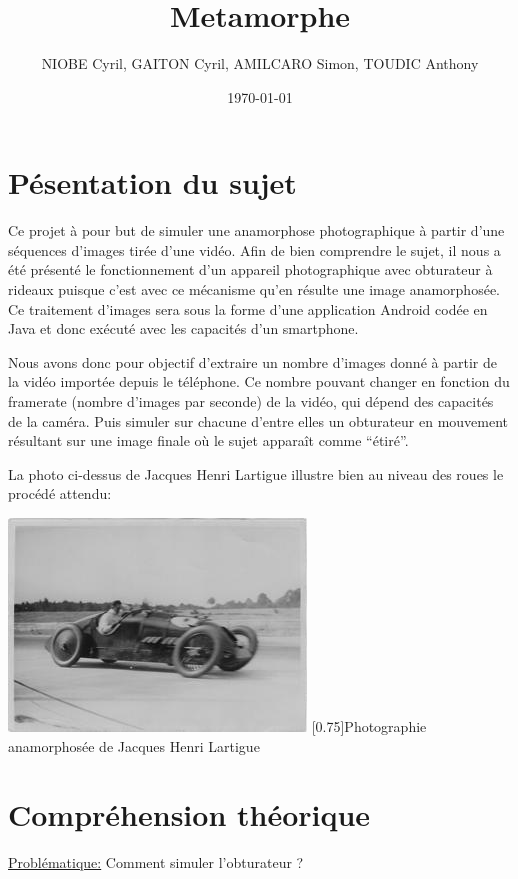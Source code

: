 \documentclass[a4paper,12pt]{report}
\title{Metamorphe}
\author{NIOBE Cyril, GAITON Cyril, AMILCARO Simon, TOUDIC Anthony}
\date{\today}
\begin{document}
\maketitle
\tableofcontents
\setcounter{tocdepth}{5}

\chapter{Pésentation du sujet}
Ce projet à pour but de simuler une anamorphose photographique à partir d’une séquences d’images tirée d’une vidéo.
Afin de bien comprendre le sujet, il nous a été présenté le fonctionnement d’un appareil photographique avec obturateur à rideaux puisque c’est avec ce mécanisme qu’en résulte une image anamorphosée.
Ce traitement d’images sera sous la forme d’une application Android codée en Java et donc exécuté avec les capacités d’un smartphone.\par\bigskip

Nous avons donc pour objectif d’extraire un nombre d’images donné à partir de la vidéo importée depuis le téléphone. 
Ce nombre pouvant changer en fonction du framerate (nombre d’images par seconde) de la vidéo, qui dépend des capacités de la caméra. 
Puis simuler sur chacune d’entre elles un obturateur en mouvement résultant sur une image finale où le sujet apparaît comme “étiré”.\par\bigskip

La photo ci-dessus de Jacques Henri Lartigue illustre bien au niveau des roues le procédé attendu:\bigskip
\begin{center}
 \includegraphics[scale=2.5]{./anamorphose.jpg}
 \scalebox{0.75}[0.75]{Photographie anamorphosée de Jacques Henri Lartigue}
\end{center}

\chapter{Compréhension théorique}
\underline{Problématique:} Comment simuler l'obturateur ?\bigskip
\end{document}
